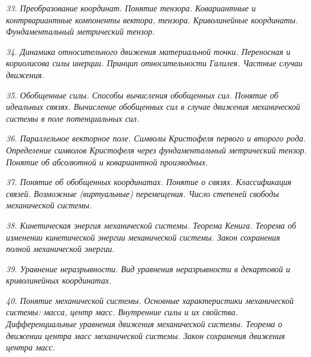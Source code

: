 \newpage %

\emph{33. Преобразование координат. Понятие тензора. Ковариантные и
контрвариантные компоненты вектора, тензора. Криволинейные координаты.
Фундаментальный метрический тензор.}

\newpage %

\emph{34. Динамика относительного движения материальной точки. Переносная и
кориолисова силы инерции. Принцип относительности Галилея. Частные случаи
движения.}

\newpage %

\emph{35. Обобщенные силы. Способы вычисления обобщенных сил. Понятие об
идеальных связях. Вычисление обобщенных сил в случае движения механической
системы в поле потенциальных сил.}

\newpage %

\emph{36. Параллельное векторное поле. Символы Кристофеля первого и второго
рода. Определение символов Кристофеля через фундаментальный метрический
тензор. Понятие об абсолютной и ковариантной производных.}

\newpage %

\emph{37. Понятие об обобщенных координатах. Понятие о связях. Классификация
связей. Возможные (виртуальные) перемещения. Число степеней свободы
механической системы.}

\newpage %

\emph{38. Кинетическая энергия механической системы. Теорема Кенига. Теорема об
изменении кинетической энергии механической системы. Закон сохранения
полной механической энергии.}

\newpage %

\emph{39. Уравнение неразрывности. Вид уравнения неразрывности в декартовой и
криволинейных координатах.}

\newpage %

\emph{40. Понятие механической системы. Основные характеристики механической
системы: масса, центр масс. Внутренние силы и их свойства. Дифференциальные
уравнения движения механической системы. Теорема о движении центра масс
механической системы. Закон сохранения движения центра масс.}

